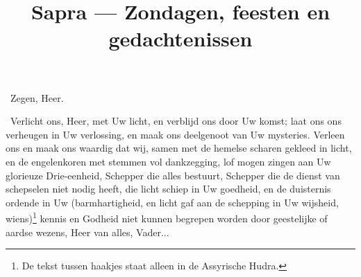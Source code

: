 \documentclass[12pt,twoside,a5paper]{article}
\begin{document}
\title{Sapra --- Zondagen, feesten en gedachtenissen}
\author{}
\date{}
\maketitle


\begin{halfparskip}
\dd~Zegen, Heer.

\cc~Verlicht ons, Heer, met Uw licht, en verblijd ons door Uw komst; laat ons ons verheugen in Uw verlossing, en maak ons deelgenoot van Uw mysteries. Verleen ons en maak ons waardig dat wij, samen met de hemelse scharen gekleed in licht, en de engelenkoren met stemmen vol dankzegging, lof mogen zingen aan Uw glorieuze Drie-eenheid, Schepper die alles bestuurt, Schepper die de dienst van schepselen niet nodig heeft, die licht schiep in Uw goedheid, en de duisternis ordende in Uw (barmhartigheid, en licht gaf aan de schepping in Uw wijsheid, wiens)\footnote{De tekst tussen haakjes staat alleen in de Assyrische Hudra.} kennis en Godheid niet kunnen begrepen worden door geestelijke of aardse wezens, Heer van alles, Vader... 
\end{halfparskip}

\end{document}
